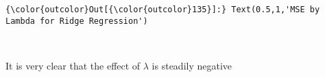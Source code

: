 \documentclass[11pt]{article}
\begin{document}
    
\begin{Verbatim}[commandchars=\\\{\}]
{\color{outcolor}Out[{\color{outcolor}135}]:} Text(0.5,1,'MSE by Lambda for Ridge Regression')
\end{Verbatim}
            
    \begin{center}
    \end{center}
    { \hspace*{\fill} \\}
    
    It is very clear that the effect of \(\lambda\) is steadily negative


    
    
    
    
\end{document}
